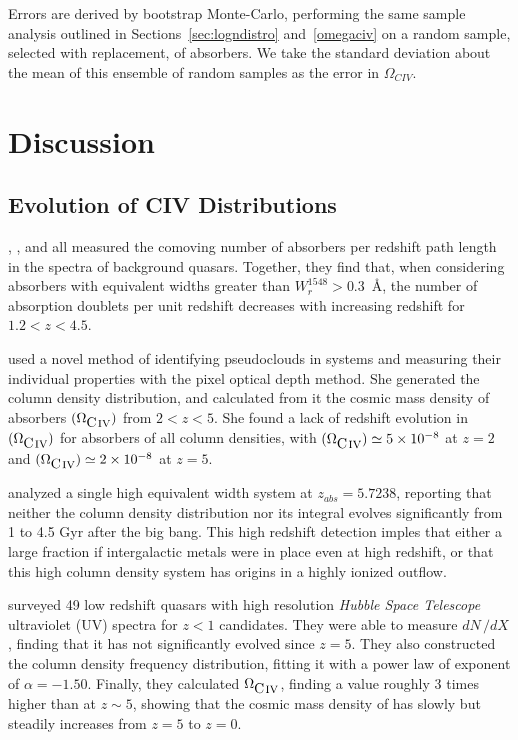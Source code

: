 \documentclass[linenumbers,twocolumn]{aastex61}
\begin{document}
Errors are derived by bootstrap Monte-Carlo, performing the same sample analysis outlined in Sections~\ref{sec:logndistro} and~\ref{omegaciv} on a random sample, selected with replacement, of {\CIV} absorbers.  We take the standard deviation about the mean of this ensemble of random samples as the error in $\Omega_{CIV}$.

\section{Discussion}
\label{sec:discussion}

\subsection{Evolution of CIV Distributions}

\cite{Steidel1990}, \cite{Sargent1988}, and \cite{Misawa2002} all measured the comoving number of {\CIV} absorbers per redshift path length in the spectra of background quasars. Together, they find that, when considering {\CIV} absorbers with equivalent widths greater than $W_r^{1548} > 0.3$~\AA, the number of absorption doublets per unit redshift decreases with increasing redshift for $1.2 < z < 4.5$.

\cite{Songaila2005} used a novel method of identifying pseudoclouds in {\CIVdblt} systems and measuring their individual properties with the pixel optical depth method. She generated the {\CIV} column density distribution, and calculated from it the cosmic mass density of {\CIV} absorbers $(\Omega_{\hbox{{\rm C}\kern 0.1em{\sc iv}}})$ from $2 < z < 5$. She found a lack of redshift evolution in $(\Omega_{\hbox{{\rm C}\kern 0.1em{\sc iv}}})$ for absorbers of all column densities, with $(\Omega_{\hbox{{\rm C}\kern 0.1em{\sc iv}}}) \simeq 5 \times 10^{-8}$ at $z = 2$ and $(\Omega_{\hbox{{\rm C}\kern 0.1em{\sc iv}}}) \simeq 2 \times 10^{-8}$ at $z = 5$. %

\cite{Ryan-Weber2006} analyzed a single high equivalent width {\CIV} system at $z_{abs} = 5.7238$, reporting that neither the column density distribution nor its integral evolves significantly from 1 to 4.5 Gyr after the big bang. This high redshift detection imples that either a large fraction if intergalactic metals were in place even at high redshift, or that this high column density system has origins in a highly ionized outflow.

\cite{Cooksey2010} surveyed 49 low redshift quasars with high resolution {\it Hubble Space Telescope} ultraviolet (UV) spectra for $z < 1$ {\CIV} candidates. They were able to measure $dN\,/dX$, finding that it has not significantly evolved since $z = 5$. They also constructed the column density frequency distribution, fitting it with a power law of exponent of $\alpha = -1.50$. Finally, they calculated $\Omega_{\hbox{{\rm C}\kern 0.1em{\sc iv}}}$, finding a value roughly 3 times higher than at $z \sim 5$, showing that the cosmic mass density of {\CIV} has slowly but steadily increases from $z = 5$ to $z = 0$.
\end{document}
